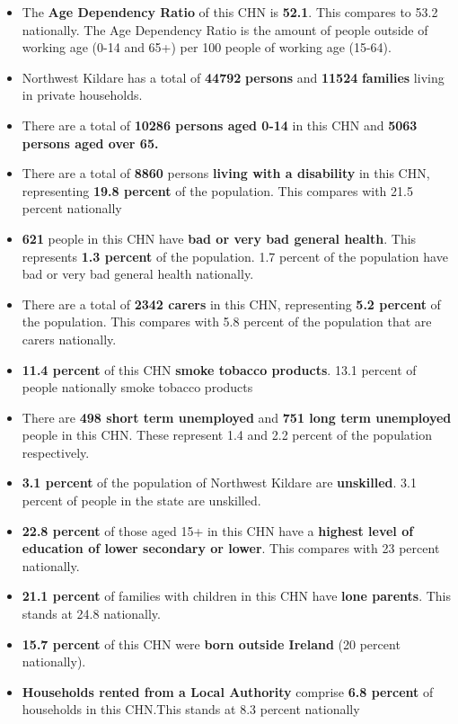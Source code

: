 \documentclass{article}
\begin{document}
\begin{itemize}

\item The \textbf{Age Dependency Ratio} of this CHN is  \textbf{52.1}. This compares to 53.2 nationally. The Age Dependency Ratio is the amount of people outside of working age (0-14 and 65+) per 100 people of working age (15-64). 

\item Northwest Kildare has a total of \textbf{\num{44792}} \textbf{persons} and  \textbf{\num{11524}} \textbf{families} living in private households.

\item There are a total of \textbf{\num{10286} persons aged 0-14} in this CHN and \textbf{\num{5063} persons aged over 65.} 

\item There are a total of \textbf{\num{8860}} persons \textbf{living with a disability} in this CHN, representing \textbf{19.8 percent} of the population. This compares with  21.5 percent nationally

\item \textbf{\num{621}} people in this CHN have \textbf{bad or very bad general health}. This represents \textbf{1.3 percent} of the population. 1.7 percent of the population have bad or very bad general health nationally. 

\item There are a total of \textbf{\num{2342} carers} in this CHN, representing \textbf{5.2 percent} of the population. This compares with 5.8 percent of the population that are carers nationally. 

\item \textbf{11.4 percent} of this CHN \textbf{smoke tobacco products}. 13.1 percent of people nationally smoke tobacco products

\item There are \textbf{\num{498} short term unemployed} and \textbf{\num{751} long term unemployed} people in this CHN. These represent 1.4 and 2.2 percent of the population respectively.

\item  \textbf{3.1 percent} of the population of Northwest Kildare are \textbf{unskilled}. 3.1 percent of people in the state are unskilled.

\item \textbf{22.8 percent} of those aged 15+ in this CHN have a \textbf{highest level of education of lower secondary or lower}. This compares with 23 percent nationally. 

\item \textbf{21.1 percent} of families with children in this CHN have \textbf{lone parents}. This stands at 24.8 nationally.

\item \textbf{15.7 percent} of this CHN were \textbf{born outside Ireland} (20 percent nationally).

\item \textbf{Households rented from a Local Authority} comprise \textbf{6.8 percent} of households in this CHN.This stands at 8.3 percent nationally

\end{itemize}
\end{document}
